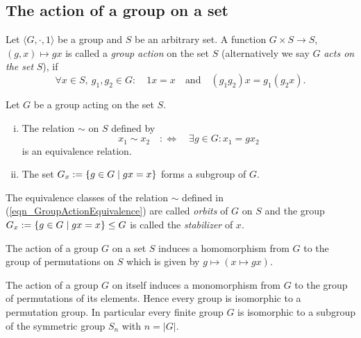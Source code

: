 \subsection{The action of a group on a set}

\begin{definition}
\label{dfn_GroupAction}
Let $\langle G, \cdot, 1 \rangle$ be a group and $S$ be an arbitrary set. A function $G \times S \to S$, $(g, x) \mapsto g x$ is called a \emph{group action} on the set $S$ (alternatively we say $G$ \emph{acts on the set} $S$), if
\begin{equation*}
\forall x \in S,\ g_1, g_2 \in G:\quad 1 x = x \quad \text{and} \quad (g_1 g_2) x = g_1 (g_2 x).
\end{equation*}
\end{definition}

\begin{theorem}
Let $G$ be a group acting on the set $S$.
\begin{enumerate}[(i)]
\item The relation $\sim$ on $S$ defined by
\begin{equation}
\label{eqn_GroupActionEquivalence}
x_1 \sim x_2 \quad:\Leftrightarrow\quad \exists g \in G: x_1 = g x_2
\end{equation}
is an equivalence relation.
\item The set $G_x := \left\{g \in G \mid gx = x\right\}$ forms a subgroup of $G$.
\end{enumerate}
\end{theorem}

\begin{definition}
\label{dfn_OrbitStabilizer}
The equivalence classes of the relation $\sim$ defined in (\ref{eqn_GroupActionEquivalence}) are called \emph{orbits} of $G$ on $S$ and the group $G_x := \left\{g \in G \mid gx = x\right\} \le G$ is called the \emph{stabilizer} of $x$.
\end{definition}

\begin{theorem}
\label{thm_GroupActionHom}
The action of a group $G$ on a set $S$ induces a homomorphism from $G$ to the group of permutations on $S$ which is given by $g \mapsto (x \mapsto gx)$.
\end{theorem}

\begin{corollary}[Cayley]
The action of a group $G$ on itself induces a monomorphism from $G$ to the group of permutations of its elements. Hence every group is isomorphic to a permutation group. In particular every finite group $G$ is isomorphic to a subgroup of the symmetric group $S_n$ with $n = |G|$.
\end{corollary}
